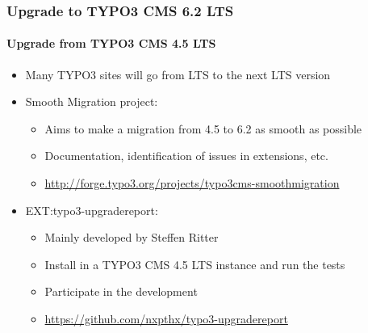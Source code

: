 
\begin{frame}[fragile]
	\frametitle{Upgrade to TYPO3 CMS 6.2 LTS}
	\framesubtitle{Upgrade from TYPO3 CMS 4.5 LTS}

	\begin{itemize}
		\item Many TYPO3 sites will go from LTS to the next LTS version
		\item Smooth Migration project:

			\begin{itemize}
				\item Aims to make a migration from 4.5 to 6.2 as smooth as possible
				\item Documentation, identification of issues in extensions, etc.
				\item \smaller\url{http://forge.typo3.org/projects/typo3cms-smoothmigration}\normalsize
			\end{itemize}

		\item EXT:typo3-upgradereport:

			\begin{itemize}
				\item Mainly developed by Steffen Ritter
				\item Install in a TYPO3 CMS 4.5 LTS instance and run the tests
				\item Participate in the development
				\item \smaller\url{https://github.com/nxpthx/typo3-upgradereport}\normalsize
			\end{itemize}
	\end{itemize}

\end{frame}


